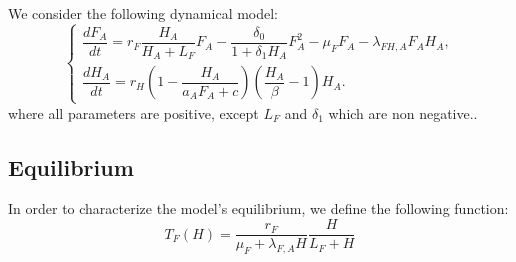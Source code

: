 \documentclass{article}
\newcommand{\lfa}{\lambda_{F, A}}
\begin{document}
We consider the following dynamical model:
\begin{equation}
\left\{ \begin{array}{l}
\dfrac{dF_{A}}{dt}=r_F  \dfrac{H_A}{H_A+L_F}F_A - \dfrac{\delta_0}{1 +\delta_1 H_A}F_A^2-\mu_{F}F_A-\lambda_{FH,A}F_AH_A,\\
\dfrac{dH_A}{dt}=r_{H}\left(1-\dfrac{H_A}{a_{A}F_{A}+c}\right)\left(\dfrac{H_A}{\beta}-1\right)H_A.
\end{array}\right.
\label{anthropicFH}
\end{equation}
where all parameters are positive, except $L_F$ and $\delta_1$ which are non negative.. 

\subsection{Equilibrium}
In order to characterize the model's equilibrium, we define the following function:
\begin{equation*}
T_F(H) = \dfrac{r_F}{\mu_F + \lfa H} \dfrac{H}{L_F + H}
\end{equation*}
\end{document}
